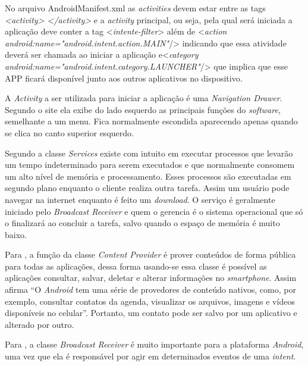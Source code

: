 	\par No arquivo AndroidManifest.xml as \textit{activities} devem estar entre as
tags \textit{<activity> </activity>} e a \textit{activity} principal, ou seja,
pela qual será iniciada a aplicação deve conter a tag <\textit{intente-filter}>
além de <\textit{action android:name="android.intent.action.MAIN"}/> indicando
que essa atividade deverá ser chamada ao iniciar a aplicação e\linebreak[4]
<\textit{category android:name="android.intent.category.LAUNCHER"}/> que
implica que esse APP ficará disponível junto aos outros aplicativos no
dispositivo.

	\par A \textit{Activity} a ser utilizada para iniciar a aplicação é uma
\textit{Navigation Drawer}. Segundo o site  ela exibe
do lado esquerdo as principais funções do \textit{software}, semelhante a um
menu. Fica normalmente escondida aparecendo apenas quando se clica no canto
superior esquerdo.

	\par Segundo  a classe \textit{Services} existe
com intuito em executar processos que levarão um tempo indeterminado para serem
executados e que normalmente consomem um alto nível de memória e processamento.
Esses processos são executadas em segundo plano enquanto o cliente realiza
outra tarefa. Assim um usuário pode navegar na internet enquanto é feito um
\textit{download}. O serviço é geralmente iniciado pelo \textit{Broadcast
Receiver} e quem o gerencia é o sistema operacional que só o finalizará ao
concluir a tarefa, salvo quando o espaço de memória é muito baixo.

	\par Para , a função da classe \textit{Content
Provider} é prover conteúdos de forma pública para todas as aplicações, dessa
forma usando-se essa classe é possível as aplicações consultar, salvar, deletar
e alterar informações no \textit{smartphone}. Assim afirma
 “O \textit{Android} tem uma série de provedores
de conteúdo nativos, como, por exemplo, consultar contatos da agenda,
visualizar os arquivos, imagens e vídeos disponíveis no celular”. Portanto, um
contato pode ser salvo por um aplicativo e alterado por outro.

	\par Para , a classe \textit{Broadcast Receiver}
é muito importante para a plataforma \textit{Android}, uma vez que ela é
responsável por agir em determinados eventos de uma \textit{intent}.

